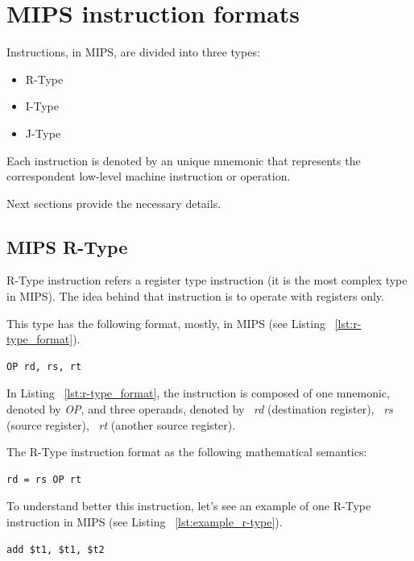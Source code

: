 \documentclass[
  oneside,
  11pt, a4paper,
  footinclude=true,
  headinclude=true,
  cleardoublepage=empty
]{scrbook}
\begin{document}
\section{MIPS instruction formats}

Instructions, in MIPS, are divided into three types:
\begin{itemize}
\item R-Type
\item I-Type
\item J-Type
\end{itemize}

Each instruction is denoted by an unique mnemonic that represents the correspondent low-level machine instruction or operation.

Next sections provide the necessary details.

\subsection{MIPS R-Type}

R-Type instruction refers a register type instruction (it is the most complex type in MIPS).
The idea behind that instruction is to operate with registers only.

This type has the following format, mostly, in MIPS (see Listing ~\ref{lst:r-type_format}).

\begin{lstlisting}[caption={R-Type instruction format},label={lst:r-type_format}]
  OP rd, rs, rt
\end{lstlisting}

In Listing ~\ref{lst:r-type_format}, the instruction is composed of one mnemonic, denoted by \textit{OP}, and three operands, denoted by ~\textit{rd} (destination register), ~\textit{rs} (source register), ~\textit{rt} (another source register).

The R-Type instruction format as the following mathematical semantics:

\begin{lstlisting}[caption={},label={}]
  rd = rs OP rt
\end{lstlisting}

To understand better this instruction, let's see an example of one R-Type instruction in MIPS (see Listing ~\ref{lst:example_r-type}).

\begin{lstlisting}[caption={Example of a R-Type instruction},label={lst:example_r-type}]
  add $t1, $t1, $t2
\end{lstlisting}
\end{document}
